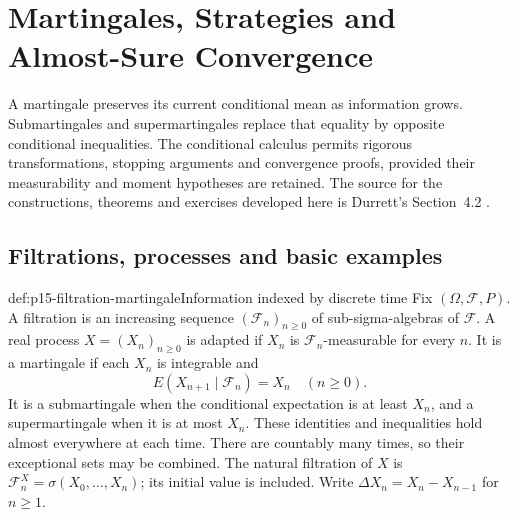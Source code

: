 \chapter{Martingales, Strategies and Almost-Sure Convergence}
\label{sec:p15-martingales-and-convergence}

A martingale preserves its current conditional mean as information grows.
Submartingales and supermartingales replace that equality by opposite
conditional inequalities. The conditional calculus permits rigorous
transformations, stopping arguments and convergence proofs, provided their
measurability and moment hypotheses are retained.
The source for the constructions, theorems and exercises developed here
is Durrett's Section~4.2 \cite[pp.~217--224]{DurrettPTEAuthor2019}.

\section{Filtrations, processes and basic examples}
\label{sec:p15-martingale-definitions}

\begin{hbdefinition}{def:p15-filtration-martingale}{Information indexed by discrete time}
Fix \((\Omega,\mathcal F,P)\). A filtration is an increasing sequence
\((\mathcal F_n)_{n\geq0}\) of sub-sigma-algebras of \(\mathcal F\).
A real process \(X=(X_n)_{n\geq0}\) is adapted if \(X_n\) is
\(\mathcal F_n\)-measurable for every \(n\).
It is a martingale if each \(X_n\) is integrable and
\[
                         E(X_{n+1}\mid\mathcal F_n)=X_n
                                      \quad(n\geq0).
\]
It is a submartingale when the conditional expectation is at least \(X_n\),
and a supermartingale when it is at most \(X_n\).
These identities and inequalities hold almost everywhere at each time.
There are countably many times, so their exceptional sets may be combined.
The natural filtration of \(X\) is
\(\mathcal F_n^X=\sigma(X_0,\ldots,X_n)\); its initial value is included.
Write \(\Delta X_n=X_n-X_{n-1}\) for \(n\geq1\).
\end{hbdefinition}

